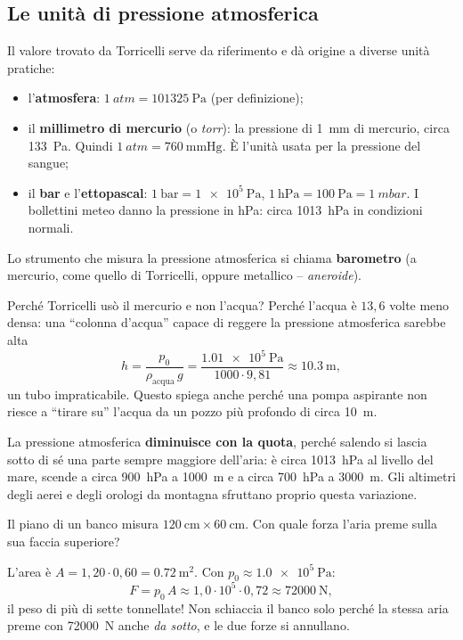 \subsection{Le unità di pressione atmosferica}
Il valore trovato da Torricelli serve da riferimento e dà origine a diverse unità pratiche:
\begin{itemize}
    \item l'\textbf{atmosfera}: $\SI{1}{atm} = \SI{101325}{\pascal}$ (per definizione);
    \item il \textbf{millimetro di mercurio} (o \emph{torr}): la pressione di \SI{1}{\milli\metre} di mercurio, circa \SI{133}{\pascal}. Quindi $\SI{1}{atm} = \SI{760}{\mmHg}$. È l'unità usata per la pressione del sangue;
    \item il \textbf{bar} e l'\textbf{ettopascal}: $\SI{1}{\bar} = \SI{1e5}{\pascal}$, $\SI{1}{\hecto\pascal} = \SI{100}{\pascal} = \SI{1}{mbar}$. I bollettini meteo danno la pressione in hPa: circa \SI{1013}{\hecto\pascal} in condizioni normali.
\end{itemize}
Lo strumento che misura la pressione atmosferica si chiama \textbf{barometro} (a mercurio, come quello di Torricelli, oppure metallico -- \emph{aneroide}).

\begin{remark}
Perché Torricelli usò il mercurio e non l'acqua? Perché l'acqua è $13{,}6$ volte meno densa: una ``colonna d'acqua'' capace di reggere la pressione atmosferica sarebbe alta
\[ h = \frac{p_0}{\rho_\text{acqua}\,g} = \frac{\SI{1,01e5}{\pascal}}{1000 \cdot 9{,}81} \approx \SI{10,3}{\metre}, \]
un tubo impraticabile. Questo spiega anche perché una pompa aspirante non riesce a ``tirare su'' l'acqua da un pozzo più profondo di circa \SI{10}{\metre}.
\end{remark}

La pressione atmosferica \textbf{diminuisce con la quota}, perché salendo si lascia sotto di sé una parte sempre maggiore dell'aria: è circa \SI{1013}{\hecto\pascal} al livello del mare, scende a circa \SI{900}{\hecto\pascal} a \SI{1000}{\metre} e a circa \SI{700}{\hecto\pascal} a \SI{3000}{\metre}. Gli altimetri degli aerei e degli orologi da montagna sfruttano proprio questa variazione.

\begin{testexample}
Il piano di un banco misura $\SI{120}{\centi\metre}\times\SI{60}{\centi\metre}$. Con quale forza l'aria preme sulla sua faccia superiore?

L'area è $A = 1{,}20 \cdot 0{,}60 = \SI{0,72}{\metre\squared}$. Con $p_0 \approx \SI{1,0e5}{\pascal}$:
\[ F = p_0\,A \approx 1{,}0\cdot 10^5 \cdot 0{,}72 \approx \SI{72000}{\newton}, \]
il peso di più di sette tonnellate! Non schiaccia il banco solo perché la stessa aria preme con \SI{72000}{\newton} anche \emph{da sotto}, e le due forze si annullano.
\end{testexample}

